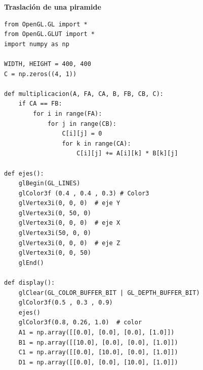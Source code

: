 \documentclass[a4paper]{article}
\begin{document}
\restoregeometry
\newpage

\Large{\textbf{Traslación de una piramide}}\\[-0.4cm]
\begin{center}
\begin{mycodeboxl}
\begin{lstlisting}
from OpenGL.GL import *
from OpenGL.GLUT import *
import numpy as np

WIDTH, HEIGHT = 400, 400
C = np.zeros((4, 1))

def multiplicacion(A, FA, CA, B, FB, CB, C):
    if CA == FB:
        for i in range(FA):
            for j in range(CB):
                C[i][j] = 0
                for k in range(CA):
                    C[i][j] += A[i][k] * B[k][j]

def ejes():
    glBegin(GL_LINES)
    glColor3f (0.4 , 0.4 , 0.3) # Color3
    glVertex3i(0, 0, 0)  # eje Y
    glVertex3i(0, 50, 0)
    glVertex3i(0, 0, 0)  # eje X
    glVertex3i(50, 0, 0)
    glVertex3i(0, 0, 0)  # eje Z
    glVertex3i(0, 0, 50)
    glEnd()

def display():
    glClear(GL_COLOR_BUFFER_BIT | GL_DEPTH_BUFFER_BIT)
    glColor3f(0.5 , 0.3 , 0.9)  
    ejes()
    glColor3f(0.8, 0.26, 1.0)  # color 
    A1 = np.array([[0.0], [0.0], [0.0], [1.0]])
    B1 = np.array([[10.0], [0.0], [0.0], [1.0]])
    C1 = np.array([[0.0], [10.0], [0.0], [1.0]])
    D1 = np.array([[0.0], [0.0], [10.0], [1.0]])
\end{lstlisting}
\end{mycodeboxl}
\end{center}
\newpage
\end{document}
